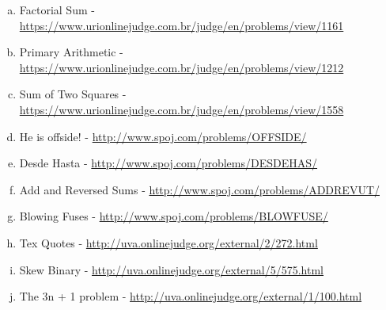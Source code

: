 \begin{enumerate}[1 -]
	
	\begin{enumerate}[a)]
		\item Factorial Sum - \href{https://www.urionlinejudge.com.br/judge/en/problems/view/1161} {https://www.urionlinejudge.com.br/judge/en/problems/view/1161}	
		\item Primary Arithmetic - \href{https://www.urionlinejudge.com.br/judge/en/problems/view/1212} {https://www.urionlinejudge.com.br/judge/en/problems/view/1212}			
		\item Sum of Two Squares - \href{https://www.urionlinejudge.com.br/judge/en/problems/view/1558} {https://www.urionlinejudge.com.br/judge/en/problems/view/1558}
		\item He is offside! - \href{http://www.spoj.com/problems/OFFSIDE/}{http://www.spoj.com/problems/OFFSIDE/}
		\item Desde Hasta - \href{http://www.spoj.com/problems/DESDEHAS/}{http://www.spoj.com/problems/DESDEHAS/}
		\item Add and Reversed Sums - \href{http://www.spoj.com/problems/ADDREVUT/}{http://www.spoj.com/problems/ADDREVUT/} 
		\item Blowing Fuses - \href{http://www.spoj.com/problems/BLOWFUSE/}{http://www.spoj.com/problems/BLOWFUSE/} 
		\item Tex Quotes - \href{http://uva.onlinejudge.org/external/2/272.html}{http://uva.onlinejudge.org/external/2/272.html} 
		\item Skew Binary - \href{http://uva.onlinejudge.org/external/5/575.html}{http://uva.onlinejudge.org/external/5/575.html}
		\item The 3n + 1 problem - \href{http://uva.onlinejudge.org/external/1/100.html}{http://uva.onlinejudge.org/external/1/100.html} 	

		
	
	\end{enumerate}
	

\end{enumerate}







